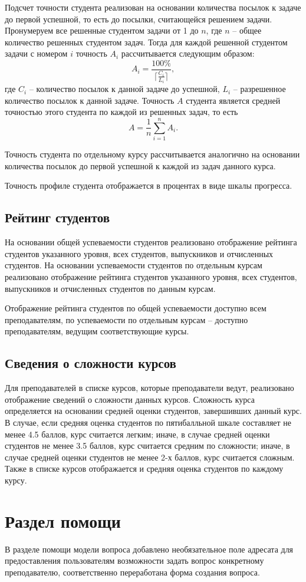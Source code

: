 \documentclass[12pt, a4paper, oneside]{article}
\begin{document}
Подсчет точности студента реализован на основании количества посылок к задаче до первой успешной, то есть до посылки, считающейся решением задачи. Пронумеруем все решенные студентом задачи от 1 до $n$, где $n$ – общее количество решенных студентом задач. Тогда для каждой решенной студентом задачи с номером $i$ точность $A_i$ рассчитывается следующим образом: 
$$A_i=\frac{100\%}{\lceil \frac{C_i}{L_i}\rceil},$$
где $C_i$ – количество посылок к данной задаче до успешной, $L_i$ – разрешенное количество посылок к данной задаче. Точность $A$ студента является средней точностью этого студента по каждой из решенных задач, то есть
$$A=\frac{1}{n}\sum_{i=1}^{n}A_i.$$

Точность студента по отдельному курсу рассчитывается аналогично на основании количества посылок до первой успешной к каждой из задач данного курса.

Точность профиле студента отображается в процентах в виде шкалы прогресса.
\subsection{Рейтинг студентов}
На основании общей успеваемости студентов реализовано отображение рейтинга студентов указанного уровня, всех студентов, выпускников и отчисленных студентов. На основании успеваемости студентов по отдельным курсам реализовано отображение рейтинга студентов указанного уровня, всех студентов, выпускников и отчисленных студентов по данным курсам.

Отображение рейтинга студентов по общей успеваемости доступно всем преподавателям, по успеваемости по отдельным курсам – доступно преподавателям, ведущим соответствующие курсы.
\subsection{Сведения о сложности курсов}
Для преподавателей в списке курсов, которые преподаватели ведут, реализовано отображение сведений о сложности данных курсов. Сложность курса определяется на основании средней оценки студентов, завершивших данный курс. В случае, если средняя оценка студентов по пятибалльной шкале составляет не менее 4.5 баллов, курс считается легким; иначе, в случае средней оценки студентов не менее 3.5 баллов, курс считается средним по сложности; иначе, в случае средней оценки студентов не менее 2-х баллов, курс считается сложным. Также в списке курсов отображается и средняя оценка студентов по каждому курсу.
\newpage

\section{Раздел помощи}
В разделе помощи модели вопроса добавлено необязательное поле адресата для предоставления пользователям возможности задать вопрос конкретному преподавателю, соответственно переработана форма создания вопроса.
\end{document}
